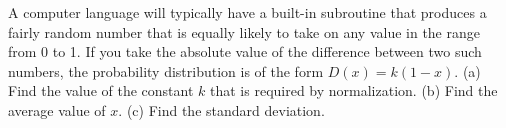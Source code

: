 A computer language will typically have a built-in
subroutine that produces a fairly random number that is equally
likely to take on any value in the range from 0 to 1. If you
take the absolute value of the difference between two such
numbers, the probability distribution is of the form
$D(x)=k(1-x)$. (a) Find the value of the constant $k$
that is required by normalization.\answercheck\hwendpart
(b) Find the average value of $x$.\answercheck\hwendpart
(c) Find the standard deviation.\answercheck\hwendpart
